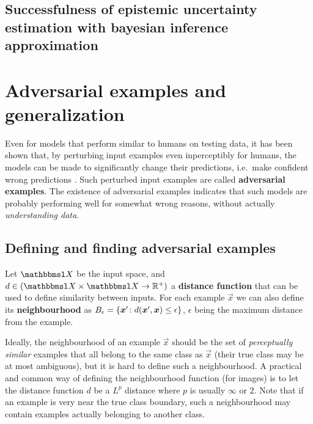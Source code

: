 \documentclass{article}
\begin{document}
\subsection{Successfulness of epistemic uncertainty estimation with bayesian inference approximation}



\section{Adversarial examples and generalization}

Even for models that perform similar to humans on testing data, it has been shown that, by perturbing input examples even inperceptibly for humans, the models can be made to significantly change their predictions, i.e.\ make confident wrong predictions \citep{Szegedy:2013:IPNN, Goodfellow:2014:EHAE}. Such perturbed input examples are called \textbf{adversarial examples}. The existence of adversarial examples indicates that such models are probably performing well for somewhat wrong reasons, without actually \textit{understanding data}.

\subsection{Defining and finding adversarial examples}

Let $\set X$ be the input space, and $d\in(\set X\times\set X\to \R^+)$ a \textbf{distance function} that can be used to define similarity between inputs. For each example $\vec x$ we can also define its \textbf{neighbourhood} as $B_{\epsilon} = \cbr{\vec x'\colon d(\vec x', \vec x) \leq \epsilon}$, $\epsilon$ being the maximum distance from the example.

Ideally, the neighbourhood of an example $\vec x$ should be the set of \textit{perceptually similar} examples that all belong to the same class as $\vec x$ (their true class may be at most ambiguous), but it is hard to define such a neighbourhood. A practical and common way of defining the neighbourhood function (for images) is to let the distance function $d$ be a $L^p$ distance where $p$ is usually $\infty$ or $2$. Note that if an example is very near the true class boundary, such a neighbourhood may contain examples actually belonging to another class. 
\end{document}
